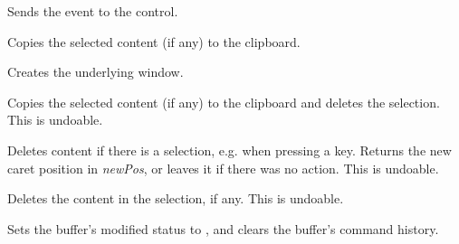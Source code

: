 \label{wxrichtextctrlcommand}


Sends the event to the control.

\label{wxrichtextctrlcopy}


Copies the selected content (if any) to the clipboard.

\label{wxrichtextctrlcreate}


Creates the underlying window.

\label{wxrichtextctrlcut}


Copies the selected content (if any) to the clipboard and deletes the selection.
This is undoable.

\label{wxrichtextctrldeleteselectedcontent}


Deletes content if there is a selection, e.g. when pressing a key.
Returns the new caret position in {\it newPos}, or leaves it if there
was no action. This is undoable.

\label{wxrichtextctrldeleteselection}


Deletes the content in the selection, if any. This is undoable.

\label{wxrichtextctrldiscardedits}


Sets the buffer's modified status to \false, and clears the buffer's command history.

\label{wxrichtextctrldogetbestsize}


